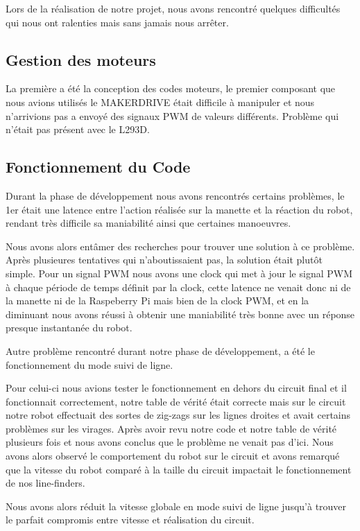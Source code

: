 Lors de la réalisation de notre projet, nous avons rencontré quelques difficultés qui nous ont ralenties mais sans jamais nous arrêter.

\subsection{Gestion des moteurs}
La première a été la conception des codes moteurs, le premier composant que nous avions utilisés le MAKERDRIVE était difficile à manipuler et nous n'arrivions pas a envoyé des signaux PWM de valeurs différents. Problème qui n'était pas présent avec le L293D.

\subsection{Fonctionnement du Code}
Durant la phase de développement nous avons rencontrés certains problèmes, le 1er était une latence entre l'action réalisée sur la manette et la réaction du robot, rendant très difficile sa maniabilité ainsi que certaines manoeuvres.

Nous avons alors entâmer des recherches pour trouver une solution à ce problème. Après plusieures tentatives qui n'aboutissaient pas, la solution était plutôt simple. Pour un signal PWM nous avons une clock qui met à jour le signal PWM à chaque période de temps définit par la clock, cette latence ne venait donc ni de la manette ni de la Raspeberry Pi mais bien de la clock PWM, et en la diminuant nous avons réussi à obtenir une maniabilité très bonne avec un réponse presque instantanée du robot.

Autre problème rencontré durant notre phase de développement, a été le fonctionnement du mode suivi de ligne.

Pour celui-ci nous avions tester le fonctionnement en dehors du circuit final et il fonctionnait correctement, notre table de vérité était correcte mais sur le circuit notre robot effectuait des sortes de zig-zags sur les lignes droites et avait certains problèmes sur les virages. Après avoir revu notre code et notre table de vérité plusieurs fois et nous avons conclus que le problème ne venait pas d'ici. Nous avons alors observé le comportement du robot sur le circuit et avons remarqué que la vitesse du robot comparé à la taille du circuit impactait le fonctionnement de nos line-finders.

Nous avons alors réduit la vitesse globale en mode suivi de ligne jusqu'à trouver le parfait compromis entre vitesse et réalisation du circuit.


